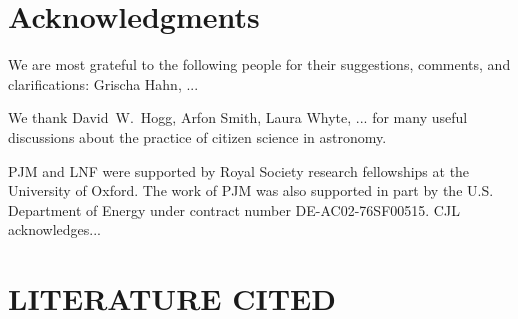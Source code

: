 \documentclass{ar2e}
\begin{document}

\section*{Acknowledgments}

We are most grateful to the following people for their suggestions, 
comments, and clarifications: Grischa Hahn, ... 

We thank David~W.~Hogg, Arfon Smith, Laura Whyte, ... for many useful
discussions about the practice of citizen science in astronomy.

PJM and LNF were supported by Royal Society research fellowships at the
University of Oxford. The work of PJM was also supported in part  by the U.S.
Department of Energy under contract number DE-AC02-76SF00515.
%
CJL acknowledges...



\section{LITERATURE CITED}



% 

\end{document}
